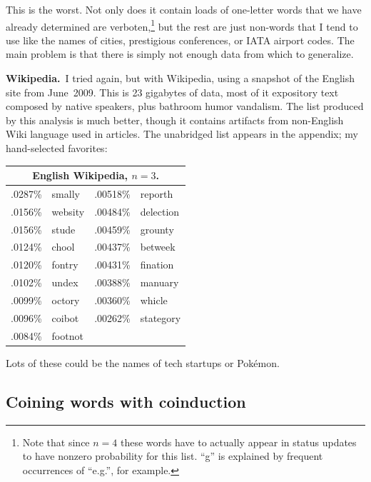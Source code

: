 \documentclass[twocolumn]{article}
\begin{document}
This is the worst. Not only does it contain loads of one-letter words that
we have already determined are verboten,\!\footnote{Note that since $n=4$ these
words have to actually appear in status updates to have nonzero probability for
this list. ``g'' is explained by frequent occurrences of ``e.g.'', for example.}
but the rest are just non-words that I tend to use like the names of cities,
prestigious conferences, or IATA airport codes. The main problem is that there
is simply not enough data from which to generalize.

{\bf Wikipedia.}\ I tried again, but with Wikipedia, using a snapshot
of the English site from June~2009. This is 23 gigabytes of data, most
of it expository text composed by native speakers, plus bathroom humor
vandalism. The list produced by this analysis is much better, though it
contains artifacts from non-English Wiki language used in articles. The
unabridged list appears in the appendix; my hand-selected favorites:

\begin{center}
\begin{tabular}{rl@{\quad\quad}rl}
\multicolumn{4}{c}{English Wikipedia, $n=3$.}     \\
\hline
.0287\% & smally      &     .00518\% & reporth    \\
.0156\% & websity     &     .00484\% & delection  \\
.0156\% & stude       &     .00459\% & grounty    \\
.0124\% & chool       &     .00437\% & betweek    \\
.0120\% & fontry      &     .00431\% & fination   \\
.0102\% & undex       &     .00388\% & manuary    \\
.0099\% & octory      &     .00360\% & whicle     \\
.0096\% & coibot      &     .00262\% & stategory  \\
.0084\% & footnot     &                           \\
\end{tabular}
\end{center}


Lots of these could be the names of tech startups or Pok\'emon.


\subsection{Coining words with coinduction} \label{sec:coin}
\end{document}
